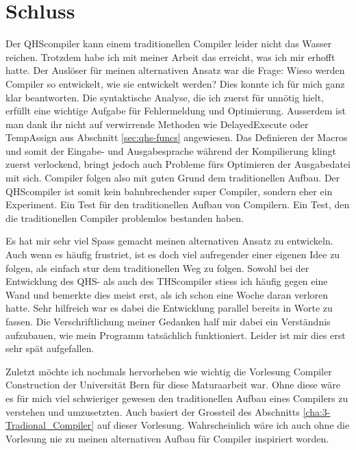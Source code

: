 \chapter{Schluss}
Der QHScompiler kann einem traditionellen Compiler leider nicht das Wasser reichen.
Trotzdem habe ich mit meiner Arbeit das erreicht, was ich mir erhofft hatte. Der Auslöser für meinen alternativen Ansatz war die Frage: Wieso werden Compiler so entwickelt, wie sie entwickelt werden? 
Dies konnte ich für mich ganz klar beantworten. Die syntaktische Analyse, die ich zuerst für unnötig hielt, erfüllt eine wichtige Aufgabe für Fehlermeldung und Optimierung.
Ausserdem ist man dank ihr nicht auf verwirrende Methoden wie DelayedExecute oder TempAssign aus Abschnitt \ref{sec:qhs-funcs} angewiesen.
Das Definieren der Macros und somit der Eingabe- und Ausgabesprache während der Kompilierung klingt zuerst verlockend, bringt jedoch auch Probleme fürs Optimieren der Ausgabedatei mit sich.
Compiler folgen also mit guten Grund dem traditionellen Aufbau.
Der QHScompiler ist somit kein bahnbrechender super Compiler, sondern eher ein Experiment.
Ein Test für den traditionellen Aufbau von Compilern. Ein Test, den die traditionellen Compiler problemlos bestanden haben.

Es hat mir sehr viel Spass gemacht meinen alternativen Ansatz zu entwickeln. Auch wenn es häufig frustriet, ist es doch viel aufregender einer eigenen Idee zu folgen, als einfach stur dem traditionellen Weg zu folgen.
Sowohl bei der Entwicklung des QHS- als auch des THScompiler stiess ich häufig gegen eine Wand und bemerkte dies meist erst, als ich schon eine Woche daran verloren hatte.
Sehr hilfreich war es dabei die Entwicklung parallel bereits in Worte zu fassen. Die Verschriftlichung meiner Gedanken half mir dabei ein Verständnis aufzubauen, wie mein Programm tatsächlich funktioniert.
Leider ist mir dies erst sehr spät aufgefallen.

Zuletzt möchte ich nochmals hervorheben wie wichtig die Vorlesung Compiler Construction der Universität Bern für diese Maturaarbeit war.
Ohne diese wäre es für mich viel schwieriger gewesen den traditionellen Aufbau eines Compilers zu verstehen und umzusetzten.
Auch basiert der Grossteil des Abschnitts \ref{cha:3-Tradional_Compiler} auf dieser Vorlesung.
Wahrscheinlich wäre ich auch ohne die Vorlesung nie zu meinen alternativen Aufbau für Compiler inspiriert worden.
